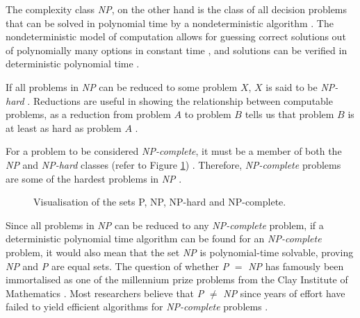\documentclass[a4paper, 12pt]{extreport}
\begin{document}
				The complexity class \textit{NP}, on the other hand is the class of all decision problems that can be solved in polynomial time by a nondeterministic algorithm \cite{computers-and-intractability}. The nondeterministic model of computation allows for guessing correct solutions out of polynomially many options in constant time \cite{npcompleteness}, and solutions can be verified in deterministic polynomial time \cite{sipser-intro-to-computation}.
				
				If all problems in \textit{NP} can be reduced to some problem $X$, $X$ is said to be \textit{NP-hard} \cite{sipser-intro-to-computation}. Reductions are useful in showing the relationship between computable problems, as a reduction from problem $A$ to problem $B$ tells us that problem $B$ is at least as hard as problem $A$ \cite{npcompleteness}.
				
				For a problem to be considered \textit{NP-complete}, it must be a member of both the \textit{NP} and \textit{NP-hard} classes (refer to Figure \ref{fig:p,np,npcomplete}) \cite{npcompleteness}. Therefore, \textit{NP-complete} problems are some of the hardest problems in \textit{NP} \cite{cc:modern}.
				
				\begin{figure}
					\centering
					\begin{adjustbox}{max width=\linewidth}
					\end{adjustbox}
					\caption{\centering Visualisation of the sets P, NP, NP-hard and NP-complete.}
					\label{fig:p,np,npcomplete}
				\end{figure}
				
				Since all problems in \textit{NP} can be reduced to any \textit{NP-complete} problem, if a deterministic polynomial time algorithm can be found for an \textit{NP-complete} problem, it would also mean that the set \textit{NP} is polynomial-time solvable, proving \textit{NP} and \textit{P} are equal sets. The question of whether \textit{P} $=$ \textit{NP} has famously been immortalised as one of the millennium prize problems from the Clay Institute of Mathematics \cite{claymathMillenniumPrize}. Most researchers believe that \textit{P} $\ne$ \textit{NP} since years of effort have failed to yield efficient algorithms for \textit{NP-complete} problems \cite{cc:modern}.
			
\end{document}
